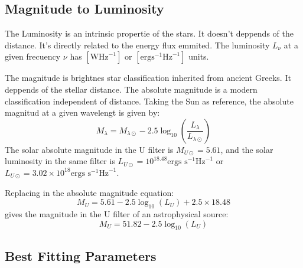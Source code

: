   \subsection{Magnitude to Luminosity}
  The Luminosity is an intrinsic propertie of the stars. It doesn't deppends of 
the distance.  It's directly related to the energy flux emmited. The luminosity 
$L_\nu$ at a given frecuency $\nu$ has $[\textrm{W}\textrm{Hz}^{-1}]$ or 
$[\textrm{erg}\textrm{s}^{-1}\textrm{Hz}^{-1}]$ units.

  The magnitude is brightnes star classification inherited from ancient Greeks. 
It deppends of the stellar distance. The absolute magnitude is a modern 
classification independent of  distance. Taking the Sun as reference, the 
absolute magnitud at a given wavelengt is given by: 
 \[ M_{\lambda} = M_{\lambda \odot} - 2.5 \log_{10}\left( 
\frac{L_\lambda}{L_{\lambda \odot}} \right) \]
  The solar absolute magnitude in the U filter is $M_{U\odot} = 5.61$,
and the solar luminosity in the same filter is $L_{U\odot} = 10^{18.48} 
\textrm{ergs s}^{-1}\textrm{Hz}^{-1}$ or $ L_{U\odot} = 3.02 \times 10^{18} 
\textrm{ergs s}^{-1}\textrm{Hz}^{-1}$.

  Replacing in the absolute magnitude equation:
  \[ M_{U} = 5.61 - 2.5 \log_{10}(L_{U}) + 2.5\times18.48\]
  gives the magnitude in the U filter of an astrophysical source:
  \[ M_{U} = 51.82 - 2.5 \log_{10}(L_{U}) \]

  \subsection{Best Fitting Parameters}


